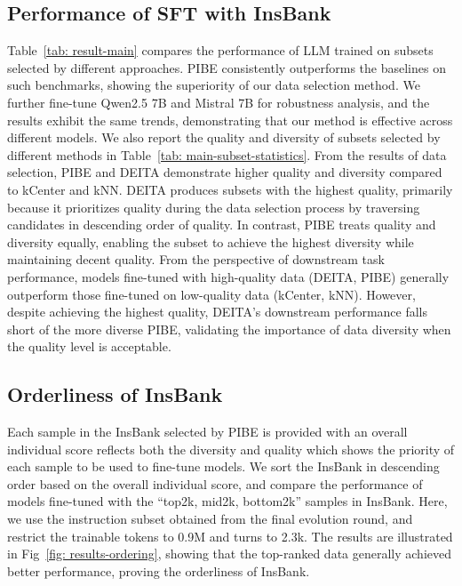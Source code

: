 \subsection{Performance of SFT with InsBank}

Table~\ref{tab: result-main} compares the performance of LLM trained on subsets selected by different approaches. PIBE consistently outperforms the baselines on such benchmarks, showing the superiority of our data selection method. We further fine-tune Qwen2.5 7B \citep{llm-qwen2.5} and Mistral 7B \citep{llm-mistral} for robustness analysis, and the results exhibit the same trends, demonstrating that our method is effective across different models. We also report the quality and diversity of subsets selected by different methods in Table~\ref{tab: main-subset-statistics}. 
From the results of data selection, PIBE and DEITA demonstrate higher quality and diversity compared to kCenter and kNN. DEITA produces subsets with the highest quality, primarily because it prioritizes quality during the data selection process by traversing candidates in descending order of quality. In contrast, PIBE treats quality and diversity equally, enabling the subset to achieve the highest diversity while maintaining decent quality. 
From the perspective of downstream task performance, models fine-tuned with high-quality data (DEITA, PIBE) generally outperform those fine-tuned on low-quality data (kCenter, kNN). However, despite achieving the highest quality, DEITA’s downstream performance falls short of the more diverse PIBE, validating the importance of data diversity when the quality level is acceptable.

\subsection{Orderliness of InsBank}
Each sample in the InsBank selected by PIBE is provided with an overall individual score reflects both the diversity and quality which shows the priority of each sample to be used to fine-tune models. We sort the InsBank in descending order based on the overall individual score, and compare the performance of models fine-tuned with the “top2k, mid2k, bottom2k” samples in InsBank. Here, we use the instruction subset obtained from the final evolution round, and restrict the trainable tokens to 0.9M and turns to 2.3k. The results are illustrated in Fig~\ref{fig: results-ordering}, showing that the top-ranked data generally achieved better performance, proving the orderliness of InsBank. 

